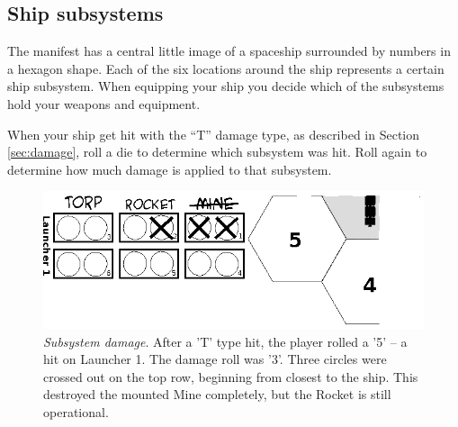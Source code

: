 \documentclass[a4paper,12pt,notitlepage,twocolumn]{article}
\begin{document}
\subsection{Ship subsystems}

The manifest has a central little image of a spaceship surrounded by
numbers in a hexagon shape. Each of the six locations around the
ship represents a certain ship subsystem. When equipping your ship you
decide which of the subsystems hold your weapons and equipment.  

When your ship get hit with the ``T'' damage type, as
described in Section \ref{sec:damage}, roll a die to determine which
subsystem was hit. Roll again to determine how much damage is applied
to that subsystem. 

\begin{figure}[h!]\centering 
  \includegraphics[width=0.5 \textwidth]{data/ship_2.eps}
  \caption{\footnotesize \emph{Subsystem damage}. After a 'T' type
    hit, the player rolled a '5' -- a hit on Launcher 1. The damage
    roll was '3'. Three circles were crossed out on the top row,
    beginning from closest to the ship. This destroyed the mounted Mine
    completely, but the Rocket is still operational.  } 
\label{fig:13}
\end{figure}
\end{document}
